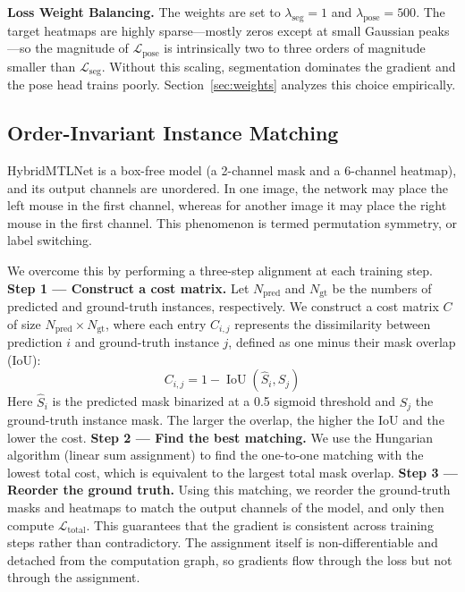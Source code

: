 \documentclass[runningheads]{llncs}
\begin{document}
\noindent\textbf{Loss Weight Balancing.}
The weights are set to $\lambda_{\text{seg}} = 1$ and
$\lambda_{\text{pose}} = 500$. The target heatmaps are highly
sparse---mostly zeros except at small Gaussian peaks---so the
magnitude of $\mathcal{L}_{\text{pose}}$ is intrinsically two to
three orders of magnitude smaller than $\mathcal{L}_{\text{seg}}$.
Without this scaling, segmentation dominates the gradient and the
pose head trains poorly. Section~\ref{sec:weights} analyzes this
choice empirically.

\subsection{Order-Invariant Instance Matching}
HybridMTLNet is a box-free model (a 2-channel mask and a 6-channel heatmap), and its output channels are unordered. In one image, the network may place the left mouse in the first channel, whereas for another image it may place the right mouse in the first channel. This phenomenon is termed permutation symmetry, or label switching.

We overcome this by performing a three-step alignment at each training step. \textbf{Step 1 --- Construct a cost matrix.} Let $N_{\text{pred}}$ and $N_{\text{gt}}$ be the numbers of predicted and ground-truth instances, respectively. We construct a cost matrix $C$ of size $N_{\text{pred}} \times N_{\text{gt}}$, where each entry $C_{i,j}$ represents the dissimilarity between prediction $i$ and ground-truth instance $j$, defined as one minus their mask overlap (IoU):
\begin{equation}
  C_{i,j} = 1 - \operatorname{IoU}(\hat{S}_i, S_j)
\end{equation}
Here $\hat{S}_i$ is the predicted mask binarized at a 0.5 sigmoid threshold and $S_j$ the ground-truth instance mask. The larger the overlap, the higher the IoU and the lower the cost. \textbf{Step 2 --- Find the best matching.} We use the Hungarian algorithm (linear sum assignment) \cite{kuhn1955hungarian} to find the one-to-one matching with the lowest total cost, which is equivalent to the largest total mask overlap. \textbf{Step 3 --- Reorder the ground truth.} Using this matching, we reorder the ground-truth masks and heatmaps to match the output channels of the model, and only then compute $\mathcal{L}_{\text{total}}$. This guarantees that the gradient is consistent across training steps rather than contradictory. The assignment itself is non-differentiable and detached from the computation graph, so gradients flow through the loss but not through the assignment.
\end{document}
